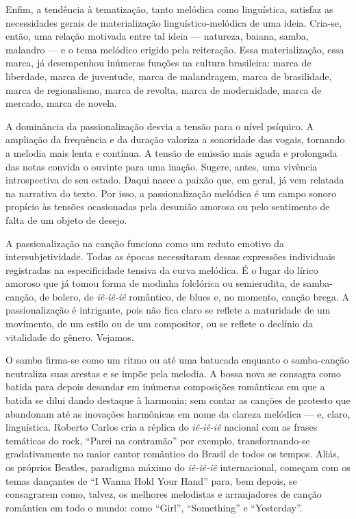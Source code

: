 Enfim, a
tendência à tematização, tanto melódica como linguística, satisfaz as
necessidades gerais de materialização linguístico-melódica de uma
ideia. Cria-se, então, uma relação motivada entre tal ideia --- natureza,
baiana, samba, malandro --- e o tema melódico erigido pela reiteração. Essa
materialização, essa marca, já desempenhou inúmeras funções na cultura
brasileira: marca de liberdade, marca de juventude, marca de
malandragem, marca de brasilidade, marca de regionalismo, marca de
revolta, marca de modernidade, marca de mercado, marca de novela.

A dominância da passionalização desvia a tensão para o nível psíquico. A
ampliação da frequência e da duração valoriza a sonoridade das vogais,
tornando a melodia mais lenta e contínua. A tensão de emissão mais aguda
e prolongada das notas convida o ouvinte para uma inação. Sugere, antes,
uma vivência introspectiva de seu estado. Daqui nasce a paixão que, em
geral, já vem relatada na narrativa do texto. Por isso, a
passionalização melódica é um campo sonoro propício às tensões
ocasionadas pela desunião amorosa ou pelo sentimento de falta de um
objeto de desejo.

A passionalização na canção funciona como um reduto emotivo da
intersubjetividade. Todas as épocas necessitaram dessas expressões
individuais registradas na especificidade tensiva da curva melódica. É o
lugar do lírico amoroso que já tomou forma de modinha folclórica ou
semierudita, de samba-canção, de bolero, de \textit{iê-iê-iê} romântico, de blues
e, no momento, canção brega. A passionalização é intrigante, pois não
fica claro se reflete a maturidade de um movimento, de um estilo ou de
um compositor, ou se reflete o declínio da vitalidade do gênero.
Vejamos.

O samba firma-se como um ritmo ou até uma batucada enquanto o
samba-canção neutraliza suas arestas e se impõe pela melodia. A bossa
nova se consagra como batida para depois desandar em inúmeras
composições românticas em que a batida se dilui dando destaque à
harmonia; sem contar as canções de protesto que abandonam até as
inovações harmônicas em nome da clareza melódica --- e, claro,
linguística. Roberto Carlos cria a réplica do \textit{iê-iê-iê} nacional com as
frases temáticas do rock, ``Parei na contramão'' por exemplo,
transformando-se gradativamente no maior cantor romântico do Brasil de
todos os tempos. Aliás, os próprios Beatles, paradigma máximo do
\textit{iê-iê-iê} internacional, começam com os temas dançantes de ``I Wanna Hold
Your Hand'' para, bem depois, se consagrarem como, talvez, os melhores
melodistas e arranjadores de canção romântica em todo o mundo: como ``Girl'',
``Something'' e ``Yesterday''.

